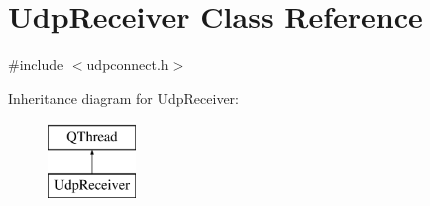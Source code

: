 \hypertarget{class_udp_receiver}{\section{Udp\-Receiver Class Reference}
\label{class_udp_receiver}
}


{\ttfamily \#include $<$udpconnect.\-h$>$}

Inheritance diagram for Udp\-Receiver\-:\begin{figure}[H]
\begin{center}
\leavevmode
\includegraphics[height=2.000000cm]{class_udp_receiver}
\end{center}
\end{figure}
